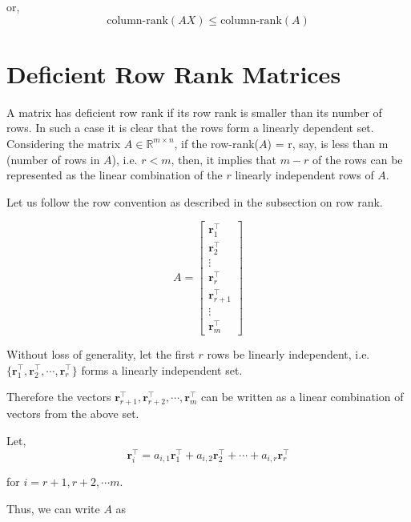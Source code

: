 \documentclass[a4paper]{article}
\begin{document}
or, \begin{equation}
\text{column-rank}(AX) \leq \text{column-rank}(A)
\end{equation}

\section{Deficient Row Rank Matrices}

A matrix has deficient row rank if its row rank is smaller than its number of rows. In such a case it is clear that the rows form a linearly dependent set. Considering the matrix $A \in \mathbb{R}^{m \times n}$, if the row-rank($A$) = r, say, is less than m (number of rows in $A$), i.e. $r < m$, then, it implies that $m-r$ of the rows can be represented as the linear combination of the $r$ linearly independent rows of $A$.

Let us follow the row convention as described in the subsection on row rank.

\begin{equation}
A = \begin{bmatrix}
\boldsymbol{r}_1^{\top} \\ \boldsymbol{r}_2^{\top} \\ \vdots \\ 
\boldsymbol{r}_{r}^{\top} \\
\boldsymbol{r}_{r+1}^{\top} \\ \vdots \\ 
\boldsymbol{r}_m^{\top} 
\end{bmatrix}
\end{equation}

Without loss of generality, let the first $r$ rows be linearly independent, i.e. $\{\boldsymbol{r}_{1}^{\top}, \boldsymbol{r}_{2}^{\top}, \cdots, \boldsymbol{r}_{r}^{\top}\}$ forms a linearly independent set.

Therefore the vectors $\boldsymbol{r}_{r+1}^{\top}, \boldsymbol{r}_{r+2}^{\top}, \cdots, \boldsymbol{r}_{m}^{\top}$ can be written as a linear combination of vectors from the above set.

Let,
\begin{equation}
\boldsymbol{r}_{i}^{\top} = a_{i,1}\boldsymbol{r}_{1}^{\top} + a_{i,2}\boldsymbol{r}_{2}^{\top} + \cdots + a_{i,r}\boldsymbol{r}_{r}^{\top}
\end{equation}

for $i = r+1, r+2, \cdots m$.

Thus, we can write $A$ as
\end{document}

